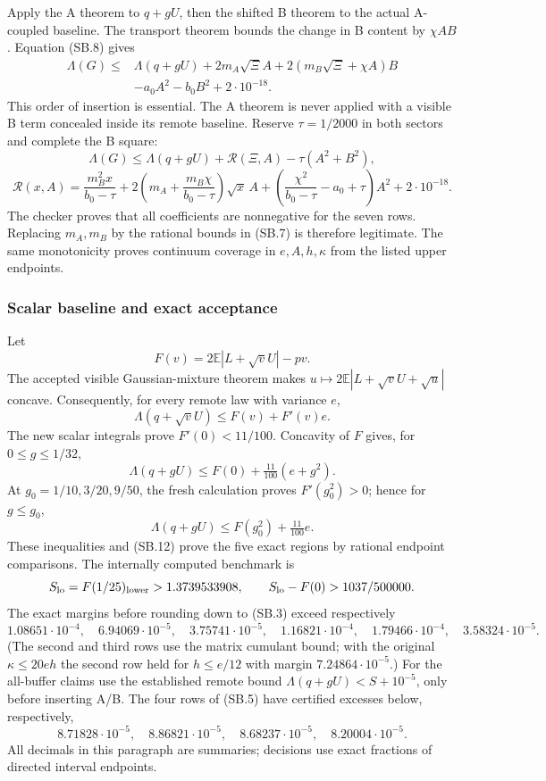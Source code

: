Apply the A theorem to \(q+gU\), then the shifted B theorem to the
actual A-coupled baseline. The transport theorem bounds the change
in B content by \(\chi AB\). Equation (SB.8) gives
\[
 \begin{split}
 \Lambda(G)\le{}&\Lambda(q+gU)
   +2m_A\sqrt\Xi A+2(m_B\sqrt\Xi+\chi A)B\\
   &-a_0A^2-b_0B^2+2\cdot10^{-18}.
 \end{split} \tag{SB.11}
\]
This order of insertion is essential. The A theorem is never applied
with a visible B term concealed inside its remote baseline.
Reserve \(\tau=1/2000\) in both sectors and complete the B square:
\[
 \boxed{\Lambda(G)\le\Lambda(q+gU)+
   \mathcal R(\Xi,A)-\tau(A^2+B^2),} \tag{SB.12}
\]
\[
 \mathcal R(x,A)=
 \frac{m_B^2x}{b_0-\tau}
 +2\left(m_A+\frac{m_B\chi}{b_0-\tau}\right)\sqrt x\,A
 +\left(\frac{\chi^2}{b_0-\tau}-a_0+\tau\right)A^2
 +2\cdot10^{-18}. \tag{SB.13}
\]
The checker proves that all coefficients are nonnegative for the
seven rows. Replacing \(m_A,m_B\) by the rational bounds in (SB.7)
is therefore legitimate. The same monotonicity proves continuum
coverage in \(e,A,h,\kappa\) from the listed upper endpoints.

\subsubsection{Scalar baseline and exact acceptance}
Let
\[
 F(v)=2\mathbb E|L+\sqrt vU|-pv.
\]
The accepted visible Gaussian-mixture theorem makes
\(u\mapsto2\mathbb E|L+\sqrt vU+\sqrt u|\) concave.
Consequently, for every remote law with variance \(e\),
\[
 \Lambda(q+\sqrt vU)\le F(v)+F'(v)e. \tag{SB.14}
\]
The new scalar integrals prove \(F'(0)<11/100\).
Concavity of \(F\) gives, for \(0\le g\le1/32\),
\[
 \Lambda(q+gU)\le F(0)+\tfrac{11}{100}(e+g^2).
\]
At \(g_0=1/10,3/20,9/50\), the fresh calculation proves
\(F'(g_0^2)>0\); hence for \(g\le g_0\),
\[
 \Lambda(q+gU)\le F(g_0^2)+\tfrac{11}{100}e.
\]
These inequalities and (SB.12) prove the five exact regions by
rational endpoint comparisons.
The internally computed benchmark is
\[
 S_{\rm lo}=F(1/25)_{\rm lower}>1.3739533908,\qquad
 S_{\rm lo}-F(0)>1037/500000.
\]
The exact margins before rounding down to (SB.3) exceed respectively
\[
 1.08651\cdot10^{-4},\quad 6.94069\cdot10^{-5},\quad
 3.75741\cdot10^{-5},\quad
 1.16821\cdot10^{-4},\quad 1.79466\cdot10^{-4},\quad
 3.58324\cdot10^{-5}.
\]
(The second and third rows use the matrix cumulant bound; with the
original \(\kappa\le20eh\) the second row held for \(h\le e/12\) with
margin \(7.24864\cdot10^{-5}\).)
For the all-buffer claims use the established remote bound
\(\Lambda(q+gU)<S+10^{-5}\), only before inserting A/B.
The four rows of (SB.5) have certified excesses below, respectively,
\[
 8.71828\cdot10^{-5},\quad8.86821\cdot10^{-5},\quad
 8.68237\cdot10^{-5},\quad8.20004\cdot10^{-5}.
\]
All decimals in this paragraph are summaries; decisions use exact
fractions of directed interval endpoints.

